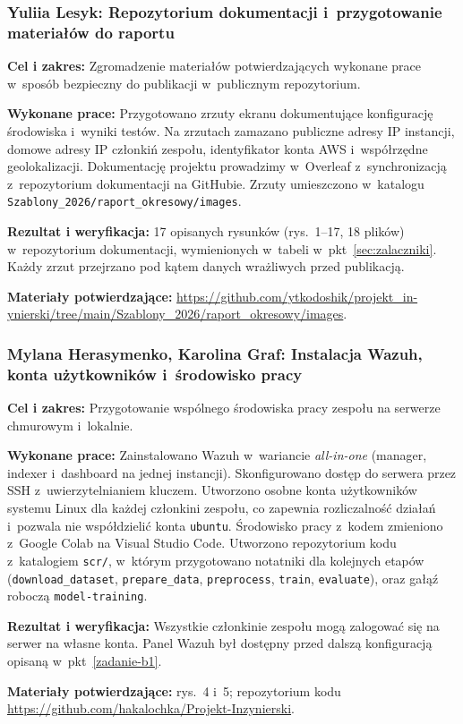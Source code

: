 \documentclass[11pt,a4paper,oneside]{article}
\newcommand{\studentA}{{Karolina Graf}}
\newcommand{\studentB}{{Yuliia Lesyk}}
\newcommand{\studentC}{{Mylana Herasymenko}}
\newcommand{\repokod}{https://github.com/hakalochka/Projekt-Inzynierski}
\newcommand{\zalaczniki}{https://github.com/ytkodoshik/projekt_in-ynierski/tree/main/Szablony_2026/raport_okresowy/images}
\begin{document}
\subsubsection{\studentB: Repozytorium dokumentacji i~przygotowanie materiałów do raportu}\label{zadanie-b3}
\textbf{Cel i zakres:} Zgromadzenie materiałów potwierdzających wykonane prace w~sposób bezpieczny do publikacji w~publicznym repozytorium.\par
\textbf{Wykonane prace:} Przygotowano zrzuty ekranu dokumentujące konfigurację środowiska i~wyniki testów. Na zrzutach zamazano publiczne adresy IP instancji, domowe adresy IP członkiń zespołu, identyfikator konta AWS i~współrzędne geolokalizacji. Dokumentację projektu prowadzimy w~Overleaf z~synchronizacją z~repozytorium dokumentacji na GitHubie. Zrzuty umieszczono w~katalogu \nolinkurl{Szablony_2026/raport_okresowy/images}.\par
\textbf{Rezultat i weryfikacja:} 17 opisanych rysunków (rys.~1--17, 18 plików) w~repozytorium dokumentacji, wymienionych w~tabeli w~pkt~\ref{sec:zalaczniki}. Każdy zrzut przejrzano pod kątem danych wrażliwych przed publikacją.\par
\textbf{Materiały potwierdzające:} \url{\zalaczniki}.

\subsubsection{\studentC, \studentA: Instalacja Wazuh, konta użytkowników i~środowisko pracy}\label{zadanie-srodowisko}
\textbf{Cel i zakres:} Przygotowanie wspólnego środowiska pracy zespołu na serwerze chmurowym i~lokalnie.\par
\textbf{Wykonane prace:} Zainstalowano Wazuh w~wariancie \textit{all-in-one} (manager, indexer i~dashboard na jednej instancji). Skonfigurowano dostęp do serwera przez SSH z~uwierzytelnianiem kluczem. Utworzono osobne konta użytkowników systemu Linux dla każdej członkini zespołu, co zapewnia rozliczalność działań i~pozwala nie współdzielić konta \texttt{ubuntu}. Środowisko pracy z~kodem zmieniono z~Google Colab na Visual Studio Code. Utworzono repozytorium kodu z~katalogiem \texttt{scr/}, w~którym przygotowano notatniki dla kolejnych etapów (\texttt{download\_dataset}, \texttt{prepare\_data}, \texttt{preprocess}, \texttt{train}, \texttt{evaluate}), oraz gałąź roboczą \texttt{model-training}.\par
\textbf{Rezultat i weryfikacja:} Wszystkie członkinie zespołu mogą zalogować się na serwer na własne konta. Panel Wazuh był dostępny przed dalszą konfiguracją opisaną w~pkt~\ref{zadanie-b1}.\par
\textbf{Materiały potwierdzające:} rys.~4 i~5; repozytorium kodu \url{\repokod}.
\end{document}
